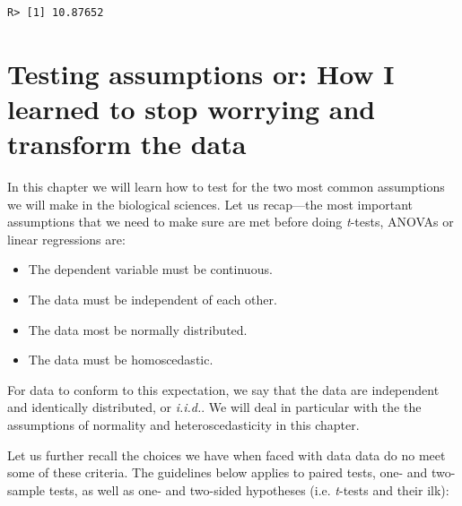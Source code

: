 \documentclass[english,10pt,a4paper,oneside]{book}
\providecommand{\tightlist}{%
  \setlength{\itemsep}{0pt}\setlength{\parskip}{0pt}}
\theoremstyle{definition}
\theoremstyle{definition}
\theoremstyle{definition}
\theoremstyle{remark}
\begin{document}
\begin{verbatim}
R> [1] 10.87652
\end{verbatim}

\chapter{Testing assumptions or: How I learned to stop worrying and
transform the
data}\label{testing-assumptions-or-how-i-learned-to-stop-worrying-and-transform-the-data}

In this chapter we will learn how to test for the two most common
assumptions we will make in the biological sciences. Let us recap---the
most important assumptions that we need to make sure are met before
doing \emph{t}-tests, ANOVAs or linear regressions are:

\begin{itemize}
\tightlist
\item
  The dependent variable must be continuous.
\item
  The data must be independent of each other.
\item
  The data most be normally distributed.
\item
  The data must be homoscedastic.
\end{itemize}

For data to conform to this expectation, we say that the data are
independent and identically distributed, or \emph{i.i.d.}. We will deal
in particular with the the assumptions of normality and
heteroscedasticity in this chapter.

Let us further recall the choices we have when faced with data data do
no meet some of these criteria. The guidelines below applies to paired
tests, one- and two-sample tests, as well as one- and two-sided
hypotheses (i.e. \emph{t}-tests and their ilk):
\end{document}
